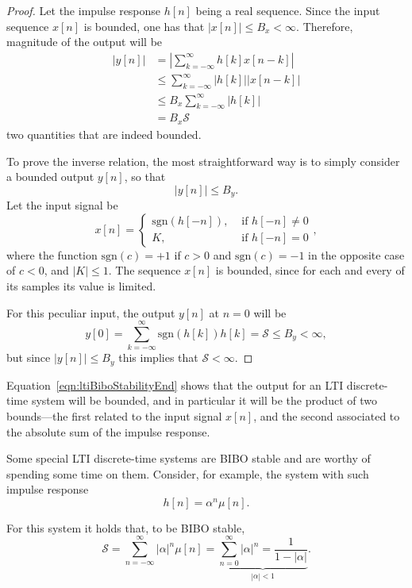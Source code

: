 \documentclass[\documentfontsize, twocolumn]{\classname}
\begin{document}
\begin{proof}
    Let the impulse response $h[n]$ being a real sequence. Since the input sequence $x[n]$ is bounded, one has that $|x[n]| \leq B_x < \infty$. Therefore, magnitude of the output will be
    \begin{align}
        |y[n]| &= \left| \sum_{k=-\infty}^\infty h[k]x[n-k]\right| \\
               &\leq \sum_{k=-\infty}^\infty |h[k]||x[n-k]| \\
               &\leq B_x \sum_{k=-\infty}^\infty |h[k]| \\
               & = B_x \mathcal S\label{eqn:ltiBiboStabilityEnd}
    \end{align}
    two quantities that are indeed bounded.

    To prove the inverse relation, the most straightforward way is to simply consider a bounded output $y[n]$, so that \[|y[n]| \leq B_y.\] Let the input signal be
\[
    x[n] = \left\{ \begin{array}{lc} \mbox{sgn} (h[-n]), & \mbox{ if } h[-n] \neq 0 \\ K, & \mbox{ if } h[-n] = 0\end{array}\right.,
\]
where the function $\mbox{sgn}(c) = +1$ if $c > 0$ and $\mbox{sgn}(c) = -1$ in the opposite case of $c<0$, and $|K| \leq 1$. The sequence $x[n]$ is bounded, since for each and every of its samples its value is limited.

For this peculiar input, the output $y[n]$ at $n=0$ will be
\[
    y[0] = \sum_{k=-\infty}^\infty \mbox{sgn}(h[k])h[k] = \mathcal S \leq B_y < \infty,
\]
but since $|y[n]| \leq B_y$ this implies that $\mathcal S < \infty$.
\end{proof}

Equation~\ref{eqn:ltiBiboStabilityEnd} shows that the output for an LTI discrete-time system will be bounded, and in particular it will be the product of two bounds---the first related to the input signal $x[n]$, and the second associated to the absolute sum of the impulse response.

Some special LTI discrete-time systems are BIBO stable and are worthy of spending some time on them. Consider, for example, the system with such impulse response \[h[n] = \alpha^n \mu[n].\]

For this system it holds that, to be BIBO stable,
\[
    \mathcal S = \sum_{n=-\infty}^\infty |\alpha|^n \mu[n] = \underbrace{\sum_{n=0}^\infty |\alpha|^n =\frac{1}{1-|\alpha|}}_{|\alpha| < 1} .
\]
\end{document}
